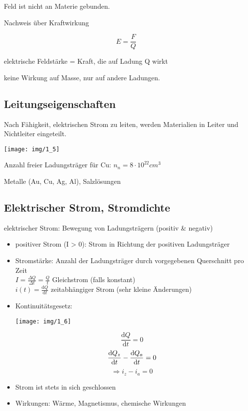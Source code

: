 Feld ist nicht an Materie gebunden.

Nachweis über Kraftwirkung

$$E = \frac{F}{Q}$$

elektrische Feldstärke = Kraft, die auf Ladung Q wirkt

keine Wirkung auf Masse, nur auf andere Ladungen.

\subsection{Leitungseigenschaften}

Nach Fähigkeit, elektrischen Strom zu leiten, werden Materialien in Leiter und Nichtleiter eingeteilt.

\texttt{[image: img/1\_5]}

Anzahl freier Ladungsträger für Cu: $n_n = 8 \cdot 10^{22}cm^3$

Metalle (Au, Cu, Ag, Al), Salzlösungen

\subsection{Elektrischer Strom, Stromdichte}

elektrischer Strom: Bewegung von Ladungsträgern (positiv \& negativ)

\begin{itemize}
	\item positiver Strom (I > 0): Strom in Richtung der positiven Ladungsträger
	\item Stromstärke: Anzahl der Ladungsträger durch vorgegebenen Querschnitt pro Zeit\\
		$I = \frac{\Delta Q}{\Delta t} = \frac{Q}{t}$ \Ra Gleichstrom (falls konstant)\\
		$i(t) = \frac{\mathrm{d}Q}{\mathrm{d}t}$ \Ra zeitabhängiger Strom (sehr kleine Änderungen)
	\item Kontinuitätsgesetz:\\
		\begin{center}
			\texttt{[image: img/1\_6]}
		\end{center}
		$$\frac{\mathrm{d}Q}{\mathrm{d}t}=0$$
		$$\frac{\mathrm{d} Q_z}{\mathrm{d} t} - \frac{\mathrm{d} Q_a}{\mathrm{d} t} = 0$$
		$$\Rightarrow i_z - i_a = 0$$
	\item Strom ist stets in sich geschlossen
	\item Wirkungen: Wärme, Magnetismus, chemische Wirkungen
\end{itemize}
